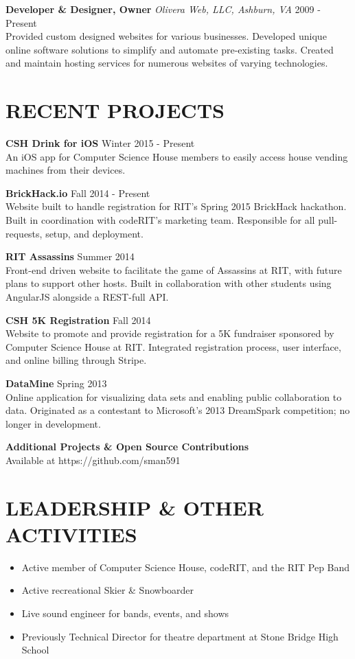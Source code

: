 \documentclass[line]{res}
\begin{document}
\begin{resume}
  \textbf{Developer \& Designer, Owner}
  \textit{Olivera Web, LLC, Ashburn, VA}
  \hfill
  2009 - Present\\
  Provided custom designed websites for various businesses.
  Developed unique online software solutions to simplify and automate pre-existing tasks.
  Created and maintain hosting services for numerous websites of varying technologies.

\section{RECENT PROJECTS}

  \textbf{CSH Drink for iOS}
  \hfill
  Winter 2015 - Present
  \\
  An iOS app for Computer Science House members to easily access house vending machines from their devices.

  \textbf{BrickHack.io}
  \hfill
  Fall 2014 - Present
  \\
  Website built to handle registration for RIT's Spring 2015 BrickHack hackathon. Built in coordination with codeRIT's marketing team. Responsible for all pull-requests, setup, and deployment.

  \textbf{RIT Assassins}
  \hfill
  Summer 2014
  \\
  Front-end driven website to facilitate the game of Assassins at RIT, with future plans to support other hosts. Built in collaboration with other students using AngularJS alongside a REST-full API.

  \textbf{CSH 5K Registration}
  \hfill
  Fall 2014
  \\
  Website to promote and provide registration for a 5K fundraiser sponsored by Computer Science House at RIT. Integrated registration process, user interface, and online billing through Stripe.

  \textbf{DataMine}
  \hfill
  Spring 2013
  \\
  Online application for visualizing data sets and enabling public collaboration to data.
  Originated as a contestant to Microsoft's 2013 DreamSpark competition; no longer in development.

  \textbf{Additional Projects \& Open Source Contributions}
  \hfill
  \\
  Available at https://github.com/sman591

\section{LEADERSHIP \& OTHER ACTIVITIES}
  \begin{itemize}[leftmargin=10pt]
  \item Active member of Computer Science House, codeRIT, and the RIT Pep Band
    \item Active recreational Skier \& Snowboarder
    \item Live sound engineer for bands, events, and shows
    \item Previously Technical Director for theatre department at Stone Bridge High School
  \end{itemize}

\end{resume}
\end{document}
